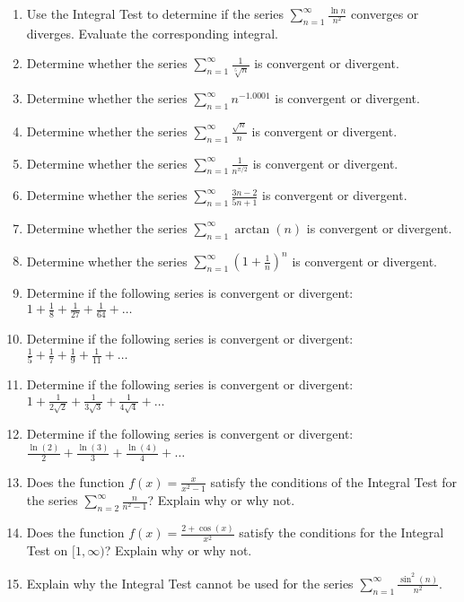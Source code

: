 \documentclass[12pt]{article}
\begin{document}
\begin{enumerate}
    \item Use the Integral Test to determine if the series $\sum_{n=1}^{\infty} \frac{\ln n}{n^2}$ converges or diverges. Evaluate the corresponding integral.

    \item Determine whether the series $\sum_{n=1}^{\infty} \frac{1}{\sqrt[5]{n}}$ is convergent or divergent.
    \item Determine whether the series $\sum_{n=1}^{\infty} n^{-1.0001}$ is convergent or divergent.
    \item Determine whether the series $\sum_{n=1}^{\infty} \frac{\sqrt{n}}{n}$ is convergent or divergent.
    \item Determine whether the series $\sum_{n=1}^{\infty} \frac{1}{n^{\pi/2}}$ is convergent or divergent.
    
    \item Determine whether the series $\sum_{n=1}^{\infty} \frac{3n-2}{5n+1}$ is convergent or divergent.
    \item Determine whether the series $\sum_{n=1}^{\infty} \arctan(n)$ is convergent or divergent.
    \item Determine whether the series $\sum_{n=1}^{\infty} \left(1 + \frac{1}{n}\right)^n$ is convergent or divergent.

    \item Determine if the following series is convergent or divergent: $1 + \frac{1}{8} + \frac{1}{27} + \frac{1}{64} + \dots$
    \item Determine if the following series is convergent or divergent: $\frac{1}{5} + \frac{1}{7} + \frac{1}{9} + \frac{1}{11} + \dots$
    \item Determine if the following series is convergent or divergent: $1 + \frac{1}{2\sqrt{2}} + \frac{1}{3\sqrt{3}} + \frac{1}{4\sqrt{4}} + \dots$
    \item Determine if the following series is convergent or divergent: $\frac{\ln(2)}{2} + \frac{\ln(3)}{3} + \frac{\ln(4)}{4} + \dots$

    \item Does the function $f(x) = \frac{x}{x^2-1}$ satisfy the conditions of the Integral Test for the series $\sum_{n=2}^{\infty} \frac{n}{n^2-1}$? Explain why or why not.
    \item Does the function $f(x) = \frac{2+\cos(x)}{x^2}$ satisfy the conditions for the Integral Test on $[1, \infty)$? Explain why or why not.
    \item Explain why the Integral Test cannot be used for the series $\sum_{n=1}^{\infty} \frac{\sin^2(n)}{n^2}$.


\end{enumerate}
\end{document}
